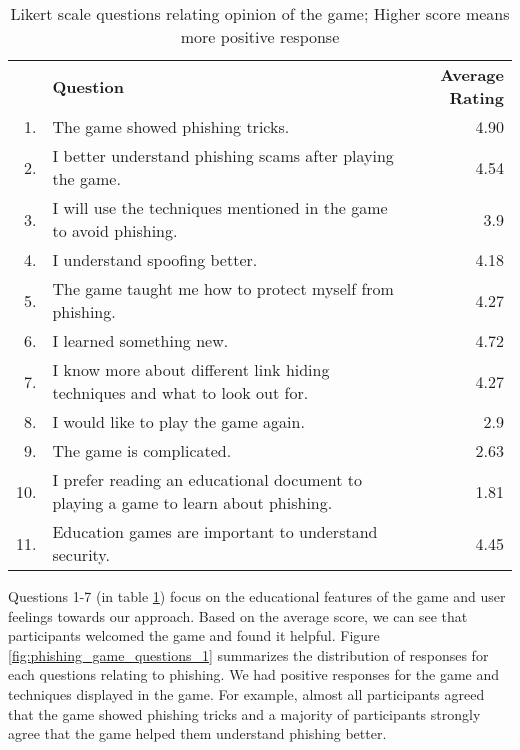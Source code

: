 \begin{table}[!ht]
    \centering
    \begin{tabular}{|r p{} r|}
        \hline
            & \textbf{Question}                                                                   & \textbf{Average Rating} \\
        1.  & The game showed phishing tricks.                                                    & 4.90                    \\
        2.  & I better understand phishing scams after playing the game.                          & 4.54                    \\
        3.  & I will use the techniques mentioned in the game to avoid phishing.                  & 3.9                     \\
        4.  & I understand spoofing better.                                                       & 4.18                    \\
        5.  & The game taught me how to protect myself from phishing.                             & 4.27                    \\
        6.  & I learned something new.                                                            & 4.72                    \\
        7.  & I know more about different link hiding techniques and what to look out for.        & 4.27                    \\
        \hline
        8.  & I would like to play the game again.                                                & 2.9                     \\
        9.  & The game is complicated.                                                            & 2.63                    \\
        10. & I prefer reading an educational document to playing a game to learn about phishing. & 1.81                    \\
        11. & Education games are important to understand security.                               & 4.45                    \\
        \hline
    \end{tabular}
    \caption[Likert scale questions relating opinion of the game]{Likert scale questions relating opinion of the game; Higher score means more positive response}
    \label{tab:game_questions}
\end{table}

Questions 1-7 (in table \ref{tab:game_questions}) focus on the educational features of the game and user feelings towards our approach. Based on the average score, we can see that participants welcomed the game and found it helpful. Figure \ref{fig:phishing_game_questions_1} summarizes the distribution of responses for each questions relating to phishing. We had positive responses for the game and techniques displayed in the game. For example, almost all participants agreed that the game showed phishing tricks and a majority of participants strongly agree that the game helped them understand phishing better.


